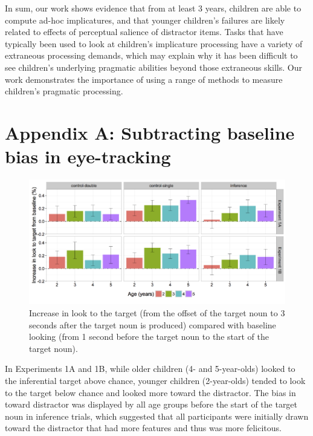 \documentclass[a4paper,man,apacite,floatsintext]{apa6}
\newenvironment{CodeChunk}{}{}
\begin{document}
In sum, our work shows evidence that from at least 3 years, children are
able to compute ad-hoc implicatures, and that younger children's
failures are likely related to effects of perceptual salience of
distractor items. Tasks that have typically been used to look at
children's implicature processing have a variety of extraneous
processing demands, which may explain why it has been difficult to see
children's underlying pragmatic abilities beyond those extraneous
skills. Our work demonstrates the importance of using a range of methods
to measure children's pragmatic processing.

\newpage

\section{Appendix A: Subtracting baseline bias in
eye-tracking}\label{appendix-a-subtracting-baseline-bias-in-eye-tracking}

\begin{CodeChunk}
\begin{figure}[H]

{\centering \includegraphics{figs/et_difference-1} 

}

\caption[Increase in look to the target (from the offset of the target noun to 3 seconds after the target noun is produced) compared with baseline looking (from 1 second before the target noun to the start of the target noun)]{Increase in look to the target (from the offset of the target noun to 3 seconds after the target noun is produced) compared with baseline looking (from 1 second before the target noun to the start of the target noun).}\label{fig:et_difference}
\end{figure}
\end{CodeChunk}

In Experiments 1A and 1B, while older children (4- and 5-year-olds)
looked to the inferential target above chance, younger children
(2-year-olds) tended to look to the target below chance and looked more
toward the distractor. The bias in toward distractor was displayed by
all age groups before the start of the target noun in inference trials,
which suggested that all participants were initially drawn toward the
distractor that had more features and thus was more felicitous.
\end{document}
